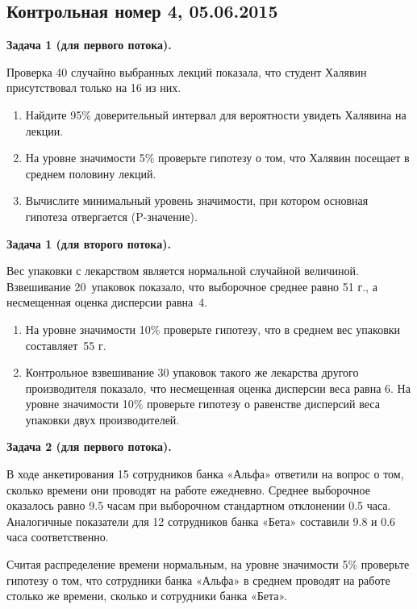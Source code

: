 \documentclass[12pt, a4paper]{article}\usepackage[]{graphicx}\usepackage[]{color}
\begin{document}
\subsection{Контрольная номер 4, 05.06.2015}


\textbf{Задача 1 (для первого потока).}

Проверка  40 случайно выбранных лекций показала, что студент Халявин присутствовал только на 16 из них.
\begin{enumerate}
\item Найдите 95\% доверительный интервал для вероятности увидеть Халявина на лекции.
\item На уровне значимости 5\% проверьте гипотезу о том, что Халявин посещает в среднем половину лекций.
\item Вычислите минимальный уровень значимости, при котором основная гипотеза отвергается (P-значение).
\end{enumerate}

\vspace{0.5cm}

\textbf{Задача 1 (для второго потока).}

Вес упаковки с лекарством является нормальной случайной величиной. Взвешивание 20~упаковок показало, что выборочное среднее равно 51 г., а  несмещенная оценка дисперсии равна~4.
\begin{enumerate}
\item На уровне значимости 10\% проверьте гипотезу, что в среднем вес упаковки составляет~55 г.
\item Контрольное взвешивание 30 упаковок такого же лекарства другого производителя показало, что несмещенная оценка дисперсии веса равна 6. На уровне значимости 10\% проверьте гипотезу о равенстве дисперсий веса упаковки двух производителей.
\end{enumerate}

\vspace{0.5cm}

\textbf{Задача 2 (для первого потока).}

В ходе анкетирования  15 сотрудников банка «Альфа» ответили на вопрос о том, сколько времени они проводят на работе ежедневно. Среднее выборочное оказалось равно 9.5 часам при выборочном стандартном отклонении 0.5 часа. Аналогичные показатели для 12 сотрудников банка «Бета» составили 9.8 и 0.6 часа соответственно.

Считая распределение времени нормальным, на уровне значимости 5\% проверьте гипотезу о том, что сотрудники банка «Альфа» в среднем проводят на работе столько же времени, сколько и сотрудники банка «Бета».
\end{document}
